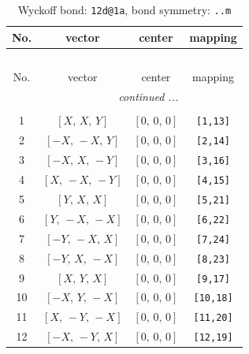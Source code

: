 \documentclass[fleqn,8pt]{jsarticle}
\begin{document}
\begin{longtable}{cccc}
\caption{Wyckoff bond: {\tt 12d@1a}, bond symmetry: {\tt ..m}}
 \\
 \hline \hline
No. & vector & center & mapping \\ \hline \endfirsthead

\multicolumn{3}{l}{\tablename\ \thetable{}} \\
 \hline \hline
No. & vector & center & mapping \\ \hline \endhead

 \hline \hline
\multicolumn{3}{r}{\footnotesize\it continued ...} \\ \endfoot

 \hline \hline
\multicolumn{3}{r}{} \\ \endlastfoot

1 & $\left[ X,\, X,\, Y \right]$ & $\left[ 0,\, 0,\, 0 \right]$ & {\tt [1,13]} \\ \hline
2 & $\left[ - X,\, - X,\, Y \right]$ & $\left[ 0,\, 0,\, 0 \right]$ & {\tt [2,14]} \\ \hline
3 & $\left[ - X,\, X,\, - Y \right]$ & $\left[ 0,\, 0,\, 0 \right]$ & {\tt [3,16]} \\ \hline
4 & $\left[ X,\, - X,\, - Y \right]$ & $\left[ 0,\, 0,\, 0 \right]$ & {\tt [4,15]} \\ \hline
5 & $\left[ Y,\, X,\, X \right]$ & $\left[ 0,\, 0,\, 0 \right]$ & {\tt [5,21]} \\ \hline
6 & $\left[ Y,\, - X,\, - X \right]$ & $\left[ 0,\, 0,\, 0 \right]$ & {\tt [6,22]} \\ \hline
7 & $\left[ - Y,\, - X,\, X \right]$ & $\left[ 0,\, 0,\, 0 \right]$ & {\tt [7,24]} \\ \hline
8 & $\left[ - Y,\, X,\, - X \right]$ & $\left[ 0,\, 0,\, 0 \right]$ & {\tt [8,23]} \\ \hline
9 & $\left[ X,\, Y,\, X \right]$ & $\left[ 0,\, 0,\, 0 \right]$ & {\tt [9,17]} \\ \hline
10 & $\left[ - X,\, Y,\, - X \right]$ & $\left[ 0,\, 0,\, 0 \right]$ & {\tt [10,18]} \\ \hline
11 & $\left[ X,\, - Y,\, - X \right]$ & $\left[ 0,\, 0,\, 0 \right]$ & {\tt [11,20]} \\ \hline
12 & $\left[ - X,\, - Y,\, X \right]$ & $\left[ 0,\, 0,\, 0 \right]$ & {\tt [12,19]} \\
\end{longtable}
\renewcommand{\arraystretch}{1.2}
\end{document}
